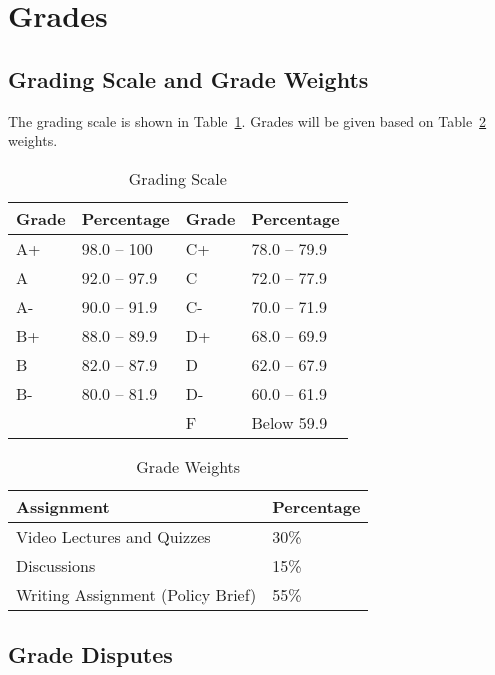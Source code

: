 \documentclass[11pt, letterpaper]{article}
\begin{document}
\section*{Grades}

\subsection*{Grading Scale and Grade Weights}  
The grading scale is shown in Table~\ref{tab:grading-scale}. Grades will be given based on Table~\ref{tab:grade-weights} weights.

\begin{table}[ht]
\centering
\caption{Grading Scale}
\begin{tabular}{llll}
\toprule
\textbf{Grade} & \textbf{Percentage} & \textbf{Grade} & \textbf{Percentage} \\ \hline
        A+ & 98.0 -- 100  & C+ & 78.0 -- 79.9 \\
        A  & 92.0 -- 97.9 & C  & 72.0 -- 77.9 \\
        A- & 90.0 -- 91.9 & C- & 70.0 -- 71.9 \\
        B+ & 88.0 -- 89.9 & D+ & 68.0 -- 69.9 \\
        B  & 82.0 -- 87.9 & D  & 62.0 -- 67.9 \\
        B- & 80.0 -- 81.9 & D- & 60.0 -- 61.9 \\
           &              & F  & Below 59.9   \\
\bottomrule
\end{tabular}
\label{tab:grading-scale}
\end{table}

\begin{table}[ht]
    \centering
    \caption{Grade Weights}
    \begin{tabular}{ll}
        \toprule
    \textbf{Assignment} & \textbf{Percentage} \\
    \midrule
    Video Lectures and Quizzes & 30\% \\
    Discussions & 15\% \\
    Writing Assignment (Policy Brief) & 55\% \\
    \bottomrule
    \end{tabular}
    \label{tab:grade-weights}
\end{table}

\subsection*{Grade Disputes}
\end{document}
